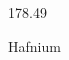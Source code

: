 \documentclass[12pt]{article}
\begin{document}
\hfill{}
\vfill
\begin{center}
  {\fontsize{50}{60}
  }

  \vspace{1em}

  178.49

Hafnium
\end{center}
\vfill
\end{document}
